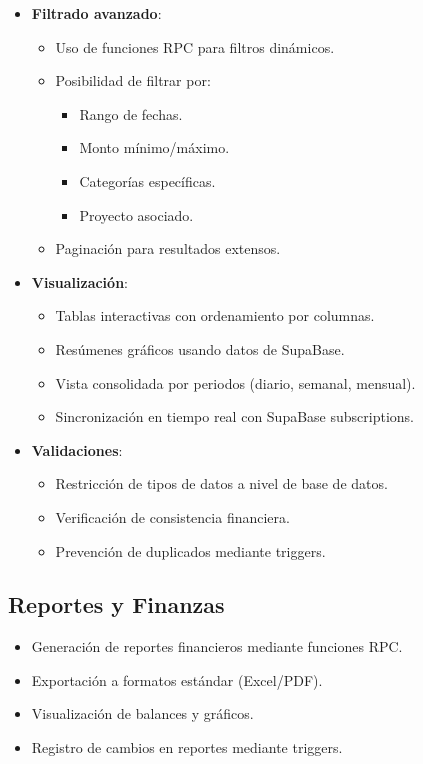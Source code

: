 \begin{itemize}
    \item \textbf{Filtrado avanzado}:
    \begin{itemize}
        \item Uso de funciones RPC para filtros dinámicos.
        \item Posibilidad de filtrar por:
        \begin{itemize}
            \item Rango de fechas.
            \item Monto mínimo/máximo.
            \item Categorías específicas.
            \item Proyecto asociado.
        \end{itemize}
        \item Paginación para resultados extensos.
    \end{itemize}
    
    \item \textbf{Visualización}:
    \begin{itemize}
        \item Tablas interactivas con ordenamiento por columnas.
        \item Resúmenes gráficos usando datos de SupaBase.
        \item Vista consolidada por periodos (diario, semanal, mensual).
        \item Sincronización en tiempo real con SupaBase subscriptions.
    \end{itemize}
    
    \item \textbf{Validaciones}:
    \begin{itemize}
        \item Restricción de tipos de datos a nivel de base de datos.
        \item Verificación de consistencia financiera.
        \item Prevención de duplicados mediante triggers.
    \end{itemize}
\end{itemize}

\subsection{Reportes y Finanzas}
\begin{itemize}
    \item Generación de reportes financieros mediante funciones RPC.
    \item Exportación a formatos estándar (Excel/PDF).
    \item Visualización de balances y gráficos.
    \item Registro de cambios en reportes mediante triggers.
\end{itemize}

